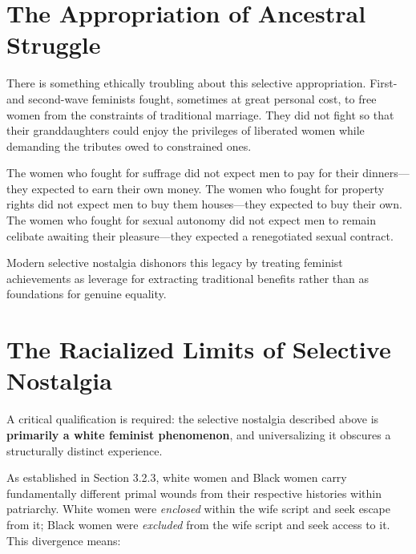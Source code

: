 \documentclass[12pt,openany]{book}
\numberwithin{equation}{chapter}
\begin{document}
\section{The Appropriation of Ancestral Struggle}

There is something ethically troubling about this selective appropriation. First- and second-wave feminists fought, sometimes at great personal cost, to free women from the constraints of traditional marriage. They did not fight so that their granddaughters could enjoy the privileges of liberated women while demanding the tributes owed to constrained ones.

The women who fought for suffrage did not expect men to pay for their dinners---they expected to earn their own money. The women who fought for property rights did not expect men to buy them houses---they expected to buy their own. The women who fought for sexual autonomy did not expect men to remain celibate awaiting their pleasure---they expected a renegotiated sexual contract.

Modern selective nostalgia dishonors this legacy by treating feminist achievements as leverage for extracting traditional benefits rather than as foundations for genuine equality.

\section{The Racialized Limits of Selective Nostalgia}

A critical qualification is required: the selective nostalgia described above is \textbf{primarily a white feminist phenomenon}, and universalizing it obscures a structurally distinct experience.

As established in Section 3.2.3, white women and Black women carry fundamentally different primal wounds from their respective histories within patriarchy. White women were \textit{enclosed} within the wife script and seek escape from it; Black women were \textit{excluded} from the wife script and seek access to it. This divergence means:
\end{document}
